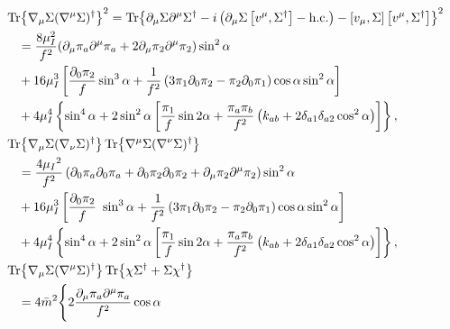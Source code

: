 \begin{align}
    \notag
    & \Tr{\nabla_\mu \Sigma (\nabla^\mu \Sigma)^\dagger}^2 
    =
    \Tr{\partial_\mu \Sigma \partial^\mu \Sigma ^\dagger
    - i \left( \partial_\mu \Sigma \com{v^\mu}{\Sigma^\dagger} - \hc \right)
    - \com{v_\mu}{\Sigma}\com{v^\mu}{\Sigma^\dagger} 
    }^2 \\\notag
    &\quad  =
    \frac{8 \mu_I^2}{f^2} 
    (\partial_\mu \pi_a \partial^\mu \pi_a + 2 \partial_\mu \pi_2 \partial^\mu \pi_2)
    \sin^2{\alpha} \\\notag
    &\quad  + 16 \mu_I^3 \left[
        \frac{\partial_0 \pi_2}{f}
            \sin^3{\alpha}
        + \frac{1}{f^2} \left(3 \pi_1 \partial_0 \pi_2 - \pi_2 \partial_0 \pi_1\right)
            \cos{\alpha} \sin^2{\alpha}
    \right] \\ \label{l1}
    & \quad + 4 \mu_I^4 
    \left\{
        \sin^4{\alpha}
        + 2 \sin^2{\alpha}
        \left[
            \frac{\pi_1}{f}\sin{2\alpha}
            + \frac{\pi_a \pi_b}{f^2}        
            \left(k_{ab} + 2\delta_{a1}\delta_{a2}\cos^2{\alpha} \right)
        \right]
    \right\}, \\
    \notag
    & \Tr{\nabla_\mu \Sigma (\nabla_\nu \Sigma)^\dagger} \Tr{\nabla^\mu \Sigma (\nabla^\nu \Sigma)^\dagger}\\ \notag
    & \quad = \frac{4 \mu_I{}^2}{f^2}
    \left(
        \partial_0 \pi_a\partial_0 \pi_a + \partial_0 \pi_2\partial_0 \pi_2 + \partial_\mu \pi_2\partial^\mu \pi_2
    \right) \sin^2{\alpha} \\\notag
    &\quad  + 16 \mu_I^3 \left[
        \frac{\partial_0 \pi_2}{f}\
            \sin^3{\alpha}
        + \frac{1}{f^2} \left(3 \pi_1 \partial_0 \pi_2 - \pi_2 \partial_0 \pi_1\right)
        \cos{\alpha} \sin^2{\alpha}
    \right] \\\label{l2}
    & \quad + 4 \mu_I^4 
    \left\{
        \sin^4{\alpha}
        + 2 \sin^2{\alpha}
        \left[
            \frac{\pi_1}{f}\sin{2\alpha} 
            + \frac{\pi_a \pi_b}{f^2}        
            \left(k_{ab} + 2 \delta_{a1}\delta_{a2} \cos^2{\alpha} \right)
        \right]
    \right\}, \\
    \notag
    & \Tr{\nabla_\mu \Sigma (\nabla^\mu \Sigma)^\dagger} 
    \Tr{\chi \Sigma^\dagger + \Sigma \chi^\dagger } \\\label{l4}
    & \quad =
    4\bar m^2
    \Bigg\{
        2 \frac{\partial_\mu \pi_a \partial^\mu \pi_a}{f^2} \cos{\alpha}

\end{align}
